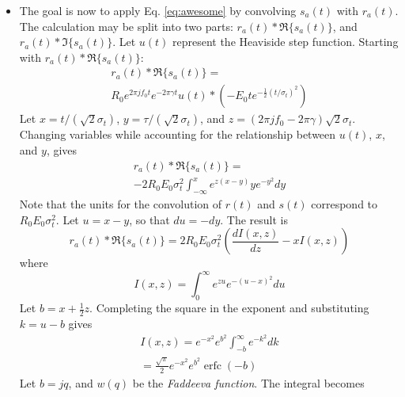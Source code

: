 \documentclass[amsmath,amssymb,aps,prd,10pt,twocolumn,showkeys]{revtex4}
\DeclareMathOperator\erfc{erfc}
\begin{document}
\begin{itemize}
\item The goal is now to apply Eq. \ref{eq:awesome} by convolving $s_a(t)$ with $r_a(t)$.  The calculation may be split into two parts: $r_a(t) * \Re\lbrace s_a(t) \rbrace$, and $r_a(t) * \Im\lbrace s_a(t) \rbrace$.  Let $u(t)$ represent the Heaviside step function.  Starting with $r_a(t) * \Re\lbrace s_a(t) \rbrace$:
\begin{multline}
r_a(t) * \Re\lbrace s_a(t) \rbrace = \\ R_0 e^{2\pi j f_0 t} e^{-2\pi\gamma t} u(t) * \left(-E_0 t e^{-\frac{1}{2}\left(t/\sigma_t\right)^2}\right)
\end{multline}
Let $x=t/(\sqrt{2}\sigma_t)$, $y=\tau/(\sqrt{2}\sigma_t)$, and $z = (2\pi j f_0 - 2\pi\gamma)\sqrt{2}\sigma_t$.  Changing variables while accounting for the relationship between $u(t)$, $x$, and $y$, gives
\begin{multline}
r_a(t) * \Re\lbrace s_a(t) \rbrace = \\ -2R_0 E_0 \sigma_t^2 \int_{-\infty}^{x} e^{z(x-y)} y e^{-y^2} dy
\end{multline}
Note that the units for the convolution of $r(t)$ and $s(t)$ correspond to $R_0 E_0 \sigma_t^2$.  Let $u = x-y$, so that $du = -dy$. The result is
\begin{equation}
r_a(t) * \Re\lbrace s_a(t) \rbrace = 2R_0 E_0 \sigma_t^2\left(\frac{dI(x,z)}{dz}-xI(x,z)\right)
\end{equation}
where
\begin{equation}
I(x,z) = \int_0^{\infty} e^{zu} e^{-(u-x)^2} du
\end{equation}
Let $b = x+\frac{1}{2} z$. Completing the square in the exponent and substituting $k = u-b$ gives
\begin{multline}
I(x,z) = e^{-x^2} e^{b^2} \int_{-b}^{\infty} e^{-k^2} dk \\ = \frac{\sqrt{\pi}}{2} e^{-x^2} e^{b^2} \erfc(-b)
\end{multline}
Let $b = jq$, and $w(q)$ be the \textit{Faddeeva function}.  The integral becomes

\end{itemize}
\end{document}
